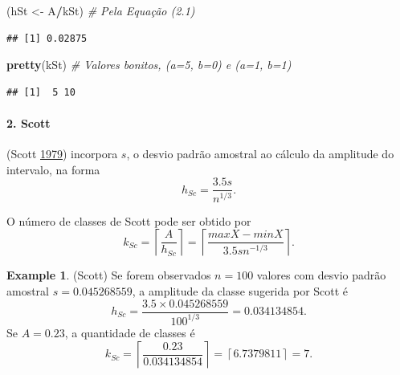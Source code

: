 \documentclass[
]{book}
\newenvironment{Shaded}{\begin{snugshade}}{\end{snugshade}}
\newcommand{\CommentTok}[1]{\textcolor[rgb]{0.56,0.35,0.01}{\textit{#1}}}
\newcommand{\KeywordTok}[1]{\textcolor[rgb]{0.13,0.29,0.53}{\textbf{#1}}}
\newcommand{\NormalTok}[1]{#1}
\newcommand{\OperatorTok}[1]{\textcolor[rgb]{0.81,0.36,0.00}{\textbf{#1}}}
\newcommand{\StringTok}[1]{\textcolor[rgb]{0.31,0.60,0.02}{#1}}
\theoremstyle{definition}
\theoremstyle{definition}
\newtheorem{example}{Example}[chapter]
\theoremstyle{definition}
\theoremstyle{remark}
\begin{document}
\begin{Shaded}
\begin{Highlighting}[]
\NormalTok{(hSt \textless{}{-}}\StringTok{ }\NormalTok{A}\OperatorTok{/}\NormalTok{kSt)                    }\CommentTok{\# Pela Equação (2.1)}
\end{Highlighting}
\end{Shaded}

\begin{verbatim}
## [1] 0.02875
\end{verbatim}

\begin{Shaded}
\begin{Highlighting}[]
\KeywordTok{pretty}\NormalTok{(kSt)                       }\CommentTok{\# Valores \textquotesingle{}bonitos\textquotesingle{}, (a=5, b=0) e (a=1, b=1)}
\end{Highlighting}
\end{Shaded}

\begin{verbatim}
## [1]  5 10
\end{verbatim}

\hypertarget{scott}{%
\paragraph*{2. Scott}\label{scott}}

(Scott \protect\hyperlink{ref-scott1979optimal}{1979}) incorpora \(s\), o desvio padrão amostral ao cálculo da amplitude do intervalo, na forma
\begin{equation}
h_{Sc} = \dfrac{3.5s}{n^{1/3}}.
\label{eq:h-scott}
\end{equation}

O número de classes de Scott pode ser obtido por
\begin{equation}
k_{Sc} = \left\lceil \dfrac{A}{h_{Sc}} \right\rceil = \left\lceil \dfrac{max{X} - min{X}}{3.5sn^{-1/3}} \right\rceil.
\label{eq:k-scott}
\end{equation}

\begin{example}
\protect\hypertarget{exm:scott}{}{\label{exm:scott} }(Scott) Se forem observados \(n=100\) valores com desvio padrão amostral \(s=0.045268559\), a amplitude da classe sugerida por Scott é \[h_{Sc} = \dfrac{3.5 \times 0.045268559}{100^{1/3}} = 0.034134854.\] Se \(A=0.23\), a quantidade de classes é \[k_{Sc} =\left\lceil \dfrac{0.23}{0.034134854} \right\rceil = \left\lceil 6.7379811 \right\rceil = 7.\]
\end{example}
\end{document}

